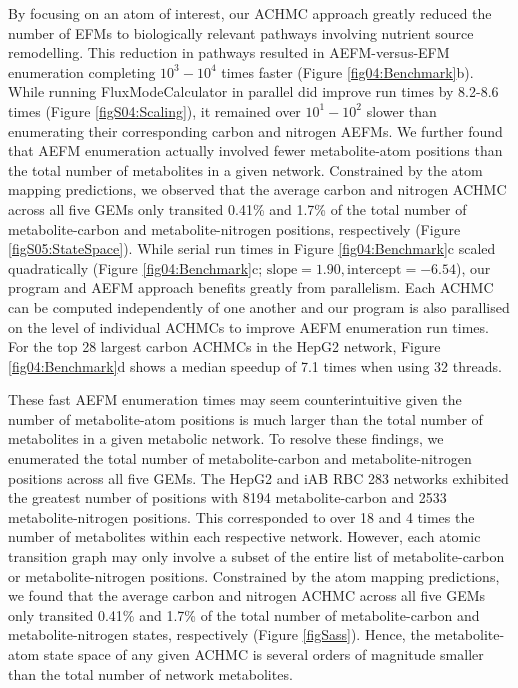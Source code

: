 \documentclass[12pt]{article}
\begin{document}
By focusing on an atom of interest, our ACHMC approach greatly reduced the
number of EFMs to biologically relevant pathways involving nutrient source
remodelling. This reduction in pathways resulted in AEFM-versus-EFM
enumeration completing $10^3-10^4$ times faster (Figure
\ref{fig04:Benchmark}b). While running FluxModeCalculator in parallel did
improve run times by 8.2-8.6 times (Figure \ref{figS04:Scaling}), it
remained over $10^1-10^2$ slower than enumerating their corresponding
carbon and nitrogen AEFMs. We further found that AEFM enumeration actually
involved fewer metabolite-atom positions than the total number of
metabolites in a given network. Constrained by the atom mapping
predictions, we observed that the average carbon and nitrogen ACHMC across
all five GEMs only transited 0.41\% and 1.7\% of the total number of
metabolite-carbon and metabolite-nitrogen positions, respectively (Figure
\ref{figS05:StateSpace}). While serial run times in Figure
\ref{fig04:Benchmark}c scaled quadratically (Figure
\ref{fig04:Benchmark}c; $\text{slope}=1.90, \text{intercept}=-6.54$), our
program and AEFM approach benefits greatly from parallelism. Each ACHMC
can be computed independently of one another and our program is also
parallised on the level of individual ACHMCs to improve AEFM enumeration
run times. For the top 28 largest carbon ACHMCs in the HepG2 network,
Figure \ref{fig04:Benchmark}d shows a median speedup of 7.1 times when
using 32 threads. 


\iffalse

These fast AEFM enumeration times may seem counterintuitive given the
number of metabolite-atom positions is much larger than the total number
of metabolites in a given metabolic network. To resolve these findings, we
enumerated the total number of metabolite-carbon and metabolite-nitrogen
positions across all five GEMs. The HepG2 and iAB RBC 283 networks
exhibited the greatest number of positions with 8194 metabolite-carbon and
2533 metabolite-nitrogen positions. This corresponded to over 18 and
4 times the number of metabolites within each respective network. However,
  each atomic transition graph may only involve a subset of the entire
  list of metabolite-carbon or metabolite-nitrogen positions. Constrained
  by the atom mapping predictions, we found that the average carbon and
  nitrogen ACHMC across all five GEMs only transited 0.41\% and
1.7\% of the total number of metabolite-carbon and metabolite-nitrogen
states, respectively (Figure \ref{figSass}). Hence, the metabolite-atom state space
of any given ACHMC is several orders of magnitude smaller than the total
number of network metabolites.
\end{document}
